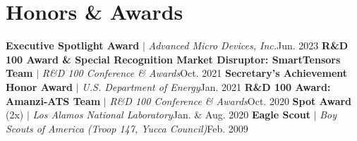 \section{Honors \& Awards}
    \resumeSubHeadingListStart
      \resumeProjectHeading
          {\textbf{Executive Spotlight Award} $|$ \emph{Advanced Micro Devices, Inc.}}{Jun. 2023}
      \resumeProjectHeading
          {\textbf{R\&D 100 Award \& Special Recognition Market Disruptor: SmartTensors Team} $|$ \emph{R\&D 100 Conference \& Awards}}{Oct. 2021}
      \resumeProjectHeading
          {\textbf{Secretary's Achievement Honor Award} $|$ \emph{U.S. Department of Energy}}{Jan. 2021}
      \resumeProjectHeading
          {\textbf{R\&D 100 Award: Amanzi-ATS Team} $|$ \emph{R\&D 100 Conference \& Awards}}{Oct. 2020}
      \resumeProjectHeading
          {\textbf{Spot Award} (2x) $|$ \emph{Los Alamos National Laboratory}}{Jan. \& Aug. 2020}
      \resumeProjectHeading
          {\textbf{Eagle Scout} $|$ \emph{Boy Scouts of America (Troop 147, Yucca Council)}}{Feb. 2009}
    \resumeSubHeadingListEnd
